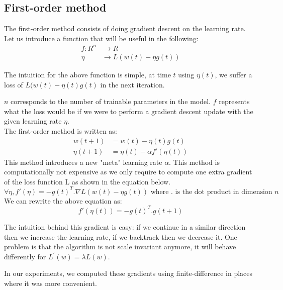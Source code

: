 \documentclass{article}
\begin{document}
  \subsection{First-order method}
  
  The first-order method consists of doing gradient descent on the learning rate.\\ 
  Let us introduce a function that will be useful in the following:\\
  \begin{align}
  f : R^{n} &\rightarrow R\\
  \eta &\rightarrow L(w(t)-\eta g(t))
  \end{align}
  
  The intuition for the above function is simple, at time $t$ using $\eta(t)$, we suffer a loss of $L(w(t) - \eta(t)g(t)$ in the next iteration.
  
  $n$ corresponds to the number of trainable parameters in the model. $f$ represents what the loss would be if we were to perform a gradient descent update with the given learning rate $\eta$.\\
  The first-order method is written as:\\
  \begin{align}
  w(t+1) &= w(t) -\eta(t)g(t)\\
  \eta(t+1) &= \eta(t) - \alpha f'(\eta(t))
  \end{align} 
  This method introduces a new "meta" learning rate $\alpha$. This method is computationally not expensive as we only require to compute one extra gradient of the loss function L as shown in the equation below. \\
  \begin{equation}
  \forall \eta, f'(\eta) = -g(t)^{T}.\nabla L(w(t)-\eta g(t)) \text{ where . is the dot product in dimension $n$}
  \end{equation}
  We can rewrite the above equation as: \\
  \begin{equation}
  f'(\eta(t)) = -g(t)^{T}.g(t+1)
  \end{equation}
  
  The intuition behind this gradient is easy: if we continue in a similar direction then we increase the learning rate, if we backtrack then we decrease it. One
  problem is that the algorithm is not scale invariant anymore, it will behave
  differently for $L^{'}(w) = \lambda L(w)$.
  
  In our experiments, we computed these gradients using finite-difference in places where it was more convenient.
  
\end{document}
